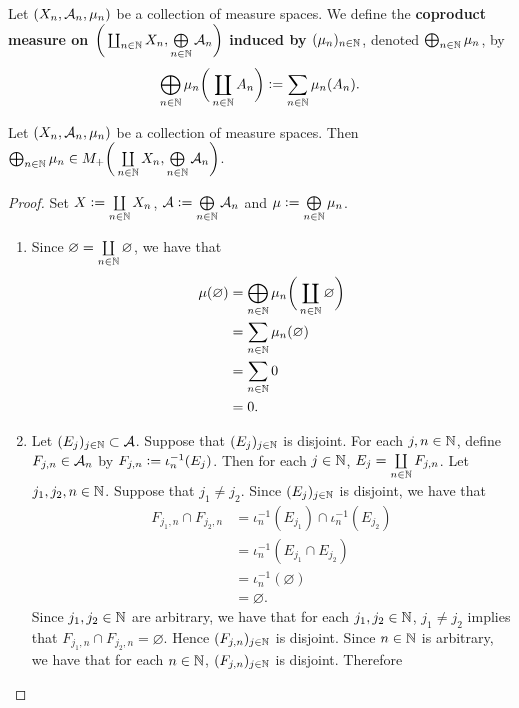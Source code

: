 \documentclass{book}
\begin{document}
\begin{defn}
	Let $(X_n,\mathcal{A}_n, \mu_n)$ be a collection of measure spaces. We define the \textbf{coproduct measure on $\bigg( \coprod_{n \in \mathbb{N}}X_n, \bigoplus\limits_{n \in \mathbb{N}} \mathcal{A}_n \bigg)$ induced by $(\mu_n)_{n \in \mathbb{N}}$}, denoted $\bigoplus_{n \in \mathbb{N}} \mu_n$, by 
	$$\bigoplus_{n \in \mathbb{N}} \mu_n \bigg( \coprod\limits_{n \in \mathbb{N}} A_n \bigg) \vcentcolon= \sum\limits_{n \in \mathbb{N}} \mu_n(A_n).$$ 
\end{defn}

\begin{ex}
	Let $(X_n,\mathcal{A}_n, \mu_n)$ be a collection of measure spaces. Then $\bigoplus_{n \in \mathbb{N}} \mu_n \in M_+\bigg( \coprod\limits_{n \in \mathbb{N}} X_n, \bigoplus\limits_{n \in \mathbb{N}} \mathcal{A}_n \bigg)$.
\end{ex}

\begin{proof}
	Set $X \vcentcolon= \coprod\limits_{n \in \mathbb{N}} X_n$, $\mathcal{A} \vcentcolon= \bigoplus\limits_{n \in \mathbb{N}} \mathcal{A}_n$ and $\mu \vcentcolon= \bigoplus\limits_{n \in \mathbb{N}} \mu_n$. 
	\begin{enumerate}
		\item Since $\varnothing = \coprod\limits_{n \in \mathbb{N}} \varnothing$, we have that 
		\begin{align*}
			\mu(\varnothing)
			& = \bigoplus_{n \in \mathbb{N}} \mu_n \bigg( \coprod\limits_{n \in \mathbb{N}} \varnothing \bigg) \\
			& = \sum\limits_{n \in \mathbb{N}} \mu_n(\varnothing) \\
			& = \sum\limits_{n \in \mathbb{N}}  0 \\
			& = 0.
		\end{align*}
		\item Let $(E_j)_{j \in \mathbb{N}} \subset \mathcal{A}$. Suppose that $(E_j)_{j \in \mathbb{N}}$ is disjoint. For each $j, n \in \mathbb{N}$, define $F_{j, n} \in \mathcal{A}_n$ by $F_{j,n} \vcentcolon= \iota_n^{-1}(E_j)$. Then for each $j \in \mathbb{N}$, $E_j = \coprod\limits_{n \in \mathbb{N}} F_{j,n}$. Let $j_1, j_2, n \in \mathbb{N}$. Suppose that $j_1 \neq j_2$. Since $(E_j)_{j \in \mathbb{N}}$ is disjoint, we have that
		\begin{align*}
			F_{j_1, n} \cap F_{j_2, n}
			& = \iota_n^{-1}(E_{j_1}) \cap \iota_n^{-1}(E_{j_2}) \\
			& = \iota_n^{-1}(E_{j_1} \cap E_{j_2}) \\
			& = \iota_n^{-1}(\varnothing) \\
			& = \varnothing.
		\end{align*}
		Since $j_1, j_2 \in \mathbb{N}$ are arbitrary, we have that for each $j_1, j_2 \in \mathbb{N}$, $j_1 \neq j_2$ implies that $F_{j_1, n} \cap F_{j_2, n} = \varnothing$. Hence $(F_{j,n})_{j \in \mathbb{N}}$ is disjoint. Since $n \in \mathbb{N}$ is arbitrary, we have that for each $n \in \mathbb{N}$, $(F_{j,n})_{j \in \mathbb{N}}$ is disjoint. Therefore 

\end{enumerate}
\end{proof}
\end{document}

